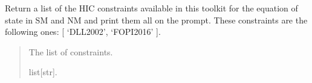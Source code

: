 \documentclass[letterpaper,10pt,english]{sphinxmanual}
\begin{document}
\begin{fulllineitems}
\label{\detokenize{source/api/setup_eos_hic:nucleardatapy.eos.setup_hic.hic_constraints}}
\pysigstartsignatures
{}
\pysigstopsignatures
\sphinxAtStartPar
Return a list of the HIC constraints available in this toolkit
for the equation of state in SM and NM and print them all on
the prompt. These constraints are the following
ones: {[} ‘DLL\sphinxhyphen{}2002’, ‘FOPI\sphinxhyphen{}2016’ {]}.
\begin{quote}\begin{description}
\sphinxAtStartPar
The list of constraints.

\sphinxAtStartPar
list{[}str{]}.

\end{description}\end{quote}

\end{fulllineitems}

\end{document}
